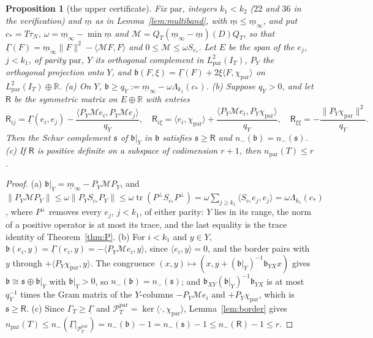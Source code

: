 \documentclass[11pt]{amsart}
\newtheorem{proposition}[theorem]{Proposition}
\theoremstyle{definition}
\theoremstyle{remark}
\newcommand{\R}{\mathbb R}
\newcommand{\PT}{\mathcal P_T}
\newcommand{\IT}{I_T}
\begin{document}
\begin{proposition}[the upper certificate]\label{prop:haynsworth}
Fix $\mathrm{par}$, integers $k_1<k_2$ ($22$ and $36$ in the verification) and $\underline m$ as in
Lemma~\ref{lem:multiband}, with $\underline m\le\underline m_\infty$, and put $c_*=T\tau_N$,
$\omega=\underline m_\infty-\min\underline m$ and $\mathcal M=Q_T(\underline m_\infty-\underline m)(D)Q_T$,
so that $\underline\Gamma(F)=\underline m_\infty\|F\|^2-\langle\mathcal MF,F\rangle$ and
$0\le\mathcal M\le\omega S_{c_*}$. Let $E$ be the span of the $e_j$, $j<k_1$, of parity $\mathrm{par}$,
$Y$ its orthogonal complement in $L^2_{\mathrm{par}}(\IT)$, $P_Y$ the orthogonal projection onto $Y$,
and $\mathfrak b(F,\xi)=\underline\Gamma(F)+2\xi\langle F,\chi_{\mathrm{par}}\rangle$ on
$L^2_{\mathrm{par}}(\IT)\oplus\R$.
\emph{(a)} On $Y$, $\mathfrak b\ge q_Y:=\underline m_\infty-\omega\Lambda_{k_1}(c_*)$.
\emph{(b)} Suppose $q_Y>0$, and let $\mathsf R$ be the symmetric matrix on $E\oplus\R$ with entries
\[
\mathsf R_{ij}=\underline\Gamma(e_i,e_j)-\frac{\langle P_Y\mathcal Me_i,P_Y\mathcal Me_j\rangle}{q_Y},\quad
\mathsf R_{i\xi}=\langle e_i,\chi_{\mathrm{par}}\rangle+\frac{\langle P_Y\mathcal Me_i,P_Y\chi_{\mathrm{par}}\rangle}{q_Y},\quad
\mathsf R_{\xi\xi}=-\frac{\|P_Y\chi_{\mathrm{par}}\|^2}{q_Y}.
\]
Then the Schur complement $\mathfrak s$ of $\mathfrak b|_Y$ in $\mathfrak b$ satisfies $\mathfrak s\ge\mathsf R$
and $n_-(\mathfrak b)=n_-(\mathfrak s)$.
\emph{(c)} If $\mathsf R$ is positive definite on a subspace of codimension $r+1$, then
$n_{\mathrm{par}}(T)\le r$.
\end{proposition}
\begin{proof}
(a) $\mathfrak b|_Y=\underline m_\infty-P_Y\mathcal MP_Y$, and
$\|P_Y\mathcal MP_Y\|\le\omega\|P_YS_{c_*}P_Y\|\le\omega\operatorname{tr}(P^\perp S_{c_*}P^\perp)
=\omega\sum_{j\ge k_1}\langle S_{c_*}e_j,e_j\rangle=\omega\Lambda_{k_1}(c_*)$, where $P^\perp$ removes every
$e_j$, $j<k_1$, of either parity: $Y$ lies in its range, the norm of a positive operator is at most its
trace, and the last equality is the trace identity of Theorem~\ref{thm:P}. (b) For $i<k_1$ and $y\in Y$,
$\mathfrak b(e_i,y)=\underline\Gamma(e_i,y)=-\langle P_Y\mathcal Me_i,y\rangle$, since $\langle e_i,y\rangle=0$,
and the border pairs with $y$ through $+\langle P_Y\chi_{\mathrm{par}},y\rangle$. The congruence
$(x,y)\mapsto(x,y+(\mathfrak b|_Y)^{-1}\mathfrak b_{YX}x)$ gives $\mathfrak b\cong\mathfrak s\oplus\mathfrak b|_Y$
with $\mathfrak b|_Y>0$, so $n_-(\mathfrak b)=n_-(\mathfrak s)$; and
$\mathfrak b_{XY}(\mathfrak b|_Y)^{-1}\mathfrak b_{YX}$ is at most $q_Y^{-1}$ times the Gram matrix of the
$Y$-columns $-P_Y\mathcal Me_i$ and $+P_Y\chi_{\mathrm{par}}$, which is $\mathfrak s\ge\mathsf R$.
(c) Since $\Gamma_T\ge\underline\Gamma$ and $\PT^{\mathrm{par}}=\ker\langle\cdot,\chi_{\mathrm{par}}\rangle$,
Lemma~\ref{lem:border} gives
$n_{\mathrm{par}}(T)\le n_-(\underline\Gamma|_{\PT^{\mathrm{par}}})=n_-(\mathfrak b)-1=n_-(\mathfrak s)-1\le n_-(\mathsf R)-1\le r$.
\end{proof}
\end{document}
